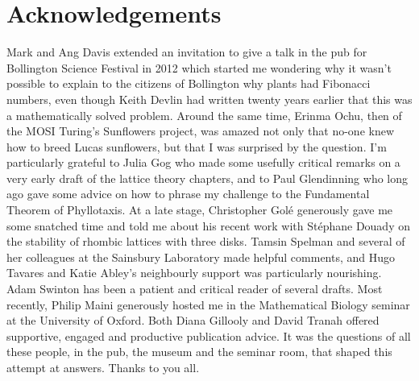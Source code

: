 


\chapter*{Acknowledgements}
Mark and Ang Davis extended an invitation to give a talk in the pub for Bollington Science Festival in 2012 which started me wondering why it wasn't possible to explain to the citizens of Bollington why plants had Fibonacci numbers, even though Keith Devlin had written twenty years earlier that this was a mathematically solved problem. Around the same time, Erinma Ochu, then of the MOSI Turing's Sunflowers project, was amazed not only that no-one knew how to breed Lucas sunflowers, but that I was surprised by the question.  
I'm particularly grateful to Julia Gog who made some usefully critical remarks on a very early draft of the lattice theory chapters, and to Paul Glendinning who long ago gave some advice on how to phrase my challenge to the Fundamental Theorem of Phyllotaxis.
At a late stage, Christopher Golé generously gave me some snatched time and told me about his recent work with Stéphane Douady on the stability of rhombic lattices with three disks. Tamsin Spelman and several of her colleagues at the Sainsbury Laboratory made helpful comments, and Hugo Tavares and Katie Abley's neighbourly support was particularly nourishing. Adam Swinton has been a patient and critical reader of several drafts.  Most recently, Philip Maini generously hosted me in the Mathematical Biology seminar at the University of Oxford. Both Diana Gillooly and David Tranah offered supportive, engaged and productive publication advice. 
It was the questions of all these people, in the pub, the museum and the seminar room, that shaped this attempt at answers.  Thanks to you all. 

